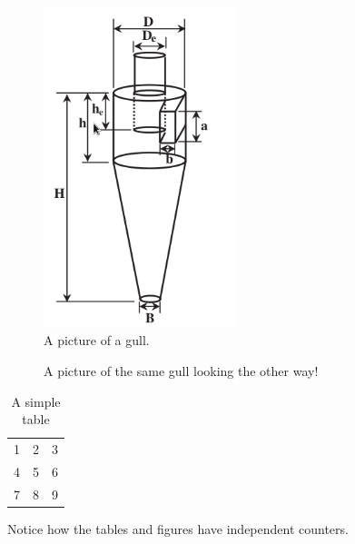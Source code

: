 \documentclass[a4paper,12pt]{beamer}
\begin{document}
 
\begin{figure}[h!]
  \caption{A picture of a gull.}
  \centering
    \includegraphics[width=0.5\textwidth]{Geometry}
\end{figure}
 
\begin{figure}[h!]
  \centering
  \caption{A picture of the same gull
           looking the other way!}
\end{figure}
 
\begin{table}[h!]
  \begin{center}
    \begin{tabular}{| l c r |}
    \hline
    1 & 2 & 3 \\
    4 & 5 & 6 \\
    7 & 8 & 9 \\
    \hline
    \end{tabular}
  \end{center}
  \caption{A simple table}
\end{table}
 
Notice how the tables and figures
have independent counters.
 
\end{document}
